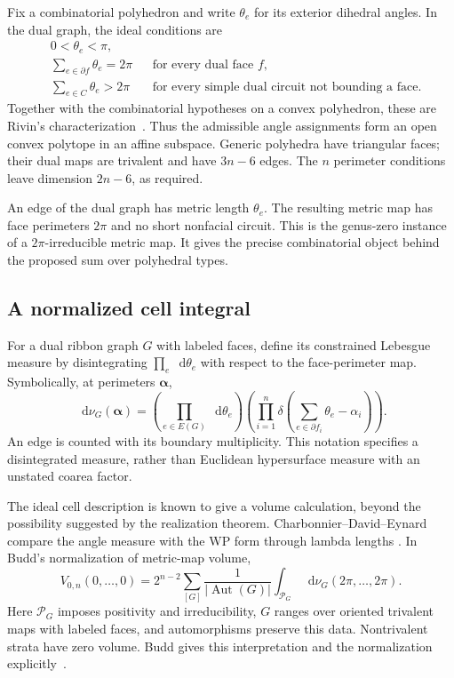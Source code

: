 \documentclass[11pt,a4paper]{article}
\numberwithin{equation}{section}
\theoremstyle{definition}
\theoremstyle{remark}
\DeclareMathOperator{\Aut}{Aut}
\newcommand{\dd}{\mathop{}\!\mathrm d}
\begin{document}
Fix a combinatorial polyhedron and write $\theta_e$ for its exterior dihedral
angles. In the dual graph, the ideal conditions are
\begin{align}
 &0<\theta_e<\pi,\label{eq:rivinangles1}\\
 &\sum_{e\in\partial f}\theta_e=2\pi
       &&\text{for every dual face }f,\label{eq:rivinangles2}\\
 &\sum_{e\in C}\theta_e>2\pi
       &&\text{for every simple dual circuit not bounding a face.}
       \label{eq:rivinangles3}
\end{align}
Together with the combinatorial hypotheses on a convex polyhedron, these
are Rivin's characterization~\cite{RivinAngles}. Thus the admissible angle
assignments form an open convex polytope in an affine subspace. Generic
polyhedra have triangular faces; their dual maps are trivalent and have
$3n-6$ edges. The $n$ perimeter conditions leave dimension $2n-6$, as required.

An edge of the dual graph has metric length $\theta_e$. The resulting metric
map has face perimeters $2\pi$ and no short nonfacial circuit. This is the
genus-zero instance of a $2\pi$-irreducible metric map. It gives the precise
combinatorial object behind the proposed sum over polyhedral types.

\subsection{A normalized cell integral}

For a dual ribbon graph $G$ with labeled faces, define its constrained
Lebesgue measure by disintegrating $\prod_e\dd\theta_e$ with respect to the
face-perimeter map. Symbolically, at perimeters $\boldsymbol\alpha$,
\begin{equation}
 \dd\nu_G(\boldsymbol\alpha)=
 \left(\prod_{e\in E(G)}\dd\theta_e\right)
 \left(\prod_{i=1}^{n}
 \delta\left(\sum_{e\in\partial f_i}\theta_e-\alpha_i\right)\right).
 \label{eq:deltameasure}
\end{equation}
An edge is counted with its boundary multiplicity. This notation specifies
a disintegrated measure, rather than Euclidean hypersurface measure with an
unstated coarea factor.

The ideal cell description is known to give a volume calculation, beyond
the possibility suggested by the realization theorem. Charbonnier--David--Eynard
compare the angle measure with the WP form through lambda lengths
\cite[Section 3.2]{CDE}. In Budd's normalization of metric-map volume,
\begin{equation}
 \boxed{
 V_{0,n}(0,\ldots,0)=
 2^{n-2}\sum_{[G]}\frac{1}{|\Aut(G)|}
 \int_{\mathcal P_G}\dd\nu_G(2\pi,\ldots,2\pi).}
 \label{eq:polyhedralpartition}
\end{equation}
Here $\mathcal P_G$ imposes positivity and irreducibility, $G$ ranges over
oriented trivalent maps with labeled faces, and automorphisms preserve this
data. Nontrivalent strata have zero volume. Budd gives this interpretation
and the normalization explicitly~\cite[Section 1.3]{Budd}.
\end{document}
